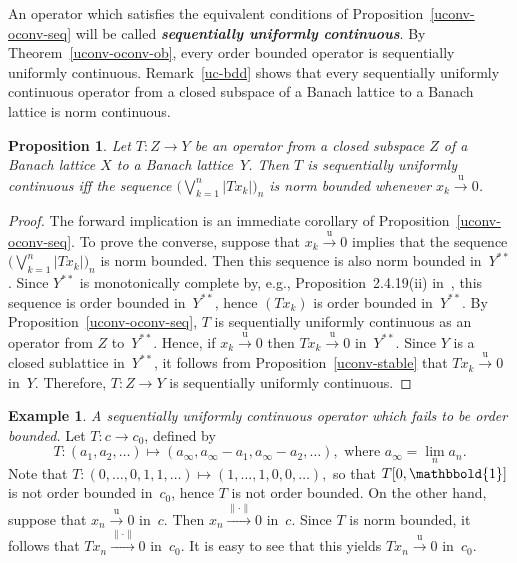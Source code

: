 \documentclass[12pt]{amsart}
\theoremstyle{plain}
\newtheorem{proposition}[theorem]{Proposition}
\theoremstyle{definition}
\newtheorem{example}[theorem]{Example}
\newcommand{\abs}[1]{\lvert#1\rvert}
\newcommand{\norm}[1]{\lVert#1\rVert}
\newcommand{\term}[1]{{\textit{\textbf{#1}}}}   %
\newcommand{\goesu}{\xrightarrow{\mathrm{u}}} %
\newcommand{\goesnorm}{\xrightarrow{\norm{\cdot}}} %
\def\one{\mathbbold{1}}
\begin{document}
An operator which satisfies the equivalent conditions of
Proposition~\ref{uconv-oconv-seq} will be called \term{sequentially
  uniformly continuous}. By Theorem~\ref{uconv-oconv-ob}, every order
bounded operator is sequentially uniformly
continuous. Remark~\ref{uc-bdd} shows that every sequentially
uniformly continuous operator from a closed subspace of a Banach
lattice to a Banach lattice is norm continuous.

\begin{proposition}
   Let $T\colon Z\to Y$ be an operator from a closed subspace $Z$ of a
  Banach lattice $X$ to a Banach lattice~$Y$. Then $T$ is
  sequentially uniformly continuous iff the sequence
  $\bigl(\bigvee_{k=1}^n\abs{Tx_k}\bigr)_n$ is norm bounded whenever
  $x_k\goesu 0$.
\end{proposition}

\begin{proof}
  The forward implication is an immediate corollary of
  Proposition~\ref{uconv-oconv-seq}. To prove the converse, suppose
  that $x_k\goesu 0$ implies that the sequence
  $\bigl(\bigvee_{k=1}^n\abs{Tx_k}\bigr)_n$ is norm bounded. Then this
  sequence is also norm bounded in~$Y^{**}$. Since $Y^{**}$ is
  monotonically complete by, e.g., Proposition~2.4.19(ii)
  in~\cite{Meyer-Nieberg:91}, this sequence is order bounded
  in~$Y^{**}$, hence $(Tx_k)$ is order bounded in~$Y^{**}$. By
  Proposition~\ref{uconv-oconv-seq}, $T$ is sequentially uniformly
  continuous as an operator from $Z$ to~$Y^{**}$. Hence, if
  $x_k\goesu 0$ then $Tx_k\goesu 0$ in~$Y^{**}$. Since $Y$ is a closed
  sublattice in~$Y^{**}$, it follows from
  Proposition~\ref{uconv-stable} that $Tx_k\goesu 0$
  in~$Y$. Therefore, $T\colon Z\to Y$ is sequentially uniformly
  continuous.
\end{proof}

\begin{example}
  \emph{A sequentially uniformly continuous operator which fails to be
    order bounded.} Let $T\colon c\to c_0$, defined by
  \begin{displaymath}
    T\colon(a_1,a_2,\dots)\mapsto(a_\infty,a_\infty-a_1,a_\infty-a_2,\dots),
    \text{ where }a_\infty=\lim_na_n.
  \end{displaymath}
  Note that
  \begin{math}
    T\colon(0,\dots,0,1,1,\dots)\mapsto(1,\dots,1,0,0,\dots),
  \end{math}
  so that $T[0,\one]$ is not order bounded in~$c_0$, hence $T$ is not
  order bounded. On the other hand, suppose that $x_n\goesu 0$
  in~$c$. Then $x_n\goesnorm 0$ in~$c$. Since $T$ is norm bounded, it
  follows that $Tx_n\goesnorm 0$ in~$c_0$. It is easy to see that this
  yields $Tx_n\goesu 0$ in~$c_0$.
\end{example}
\end{document}
